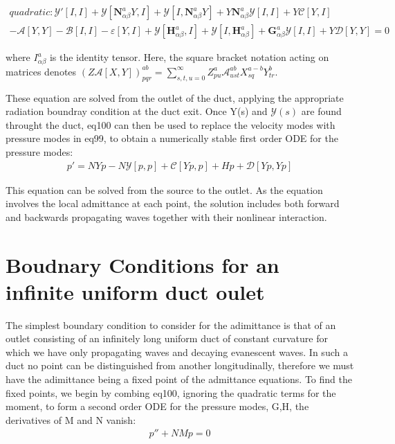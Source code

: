 \documentclass{Note}
\begin{document}
\begin{equation}
\begin{aligned}
quadratic:\mathcal{Y}'[I,I]+\mathcal{Y}[\textbf{N}_{\alpha\beta}^a Y,I]+\mathcal{Y}[I,\textbf{N}_{\alpha\beta}^a Y]+Y\textbf{N}_{\alpha\beta}^a \mathcal{Y}[I,I]+Y\mathcal{C}[Y,I]\\-\mathcal{A}[Y,Y]-\mathcal{B}[I,I]-\varepsilon[Y,I]
+\mathcal{Y}[\textbf{H}_{\alpha\beta}^a ,I]+\mathcal{Y}[I, \textbf{H}_{\alpha\beta}^a]+\textbf{G}_{\alpha\beta}^a \mathcal{Y}[I,I]+Y \mathcal{D}[Y,Y]=0
\end{aligned}
\end{equation}

where $I^a_{\alpha\beta}$ is the identity tensor. Here, the square bracket notation acting on matrices denotes $(Z\mathcal{A}[X,Y])_{pqr}^{ab}=\sum_{s,t,u=0}^\infty Z_{pu}^a \mathcal{A}_{ust}^{ab}X_{sq}^{a-b}Y_{tr}^b$.

These equation are solved from the outlet of the duct, applying the appropriate radiation boundray condition at the duct exit. Once Y(s) and $\mathcal{Y}(s)$ are found throught the duct, eq100 can then be used to replace the velocity modes with pressure modes in eq99, to obtain a numerically stable first order ODE for the pressure modes:
\begin{equation}
\begin{aligned}
p'=NYp-N\mathcal{Y}[p,p]+\mathcal{C}[Yp,p]+Hp+\mathcal{D}[Yp,Yp]
\end{aligned}
\end{equation}

This equation can be solved from the source to the outlet. As the equation involves the local admittance at each point, the solution includes both forward and backwards propagating waves together with their nonlinear interaction.

\section{Boudnary Conditions for an infinite uniform duct oulet}

The simplest boundary condition to consider for the adimittance is that of an outlet consisting of an infinitely long uniform duct of constant curvature for which we have only propagating waves and decaying evanescent waves. In such a duct no point can be distinguished from another longitudinally, therefore we must have the adimittance being a fixed point of the admittance equations. To find the fixed points, we begin by combing eq100, ignoring the quadratic terms for the moment, to form a second order ODE for the pressure modes, G,H, the derivatives of M and N vanish:
\begin{equation}
\begin{aligned}
p''+NMp=0
\end{aligned}
\end{equation}
\end{document}
